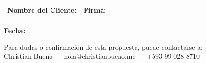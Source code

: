 \documentclass[12pt,a4paper]{article}
\begin{document}
\begin{tabular}{p{7cm} p{7cm}}
\textbf{Nombre del Cliente:} & \textbf{Firma:} \\
\\[1.5cm]
\hline
\end{tabular}

\vspace{1cm}
\noindent
\textbf{Fecha:} \_\_\_\_\_\_\_\_\_\_\_\_\_\_\_\_\_\_\_

\vfill
\begin{center}
\small Para dudas o confirmación de esta propuesta, puede contactarse a:\\
Christian Bueno — hola@christianbueno.me — +593 99 028 8710
\end{center}
\end{document}
